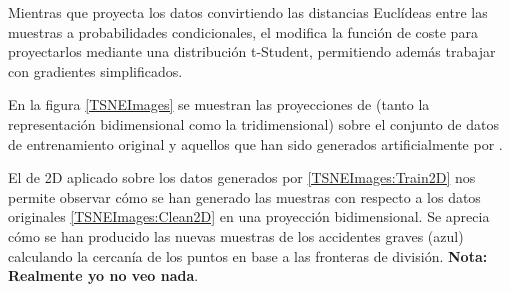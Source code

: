             Mientras que  proyecta los datos convirtiendo las distancias Euclídeas entre las muestras a probabilidades condicionales, el  modifica la función de coste para proyectarlos mediante una distribución t-Student, permitiendo además trabajar con gradientes simplificados.


            En la figura \ref{TSNEImages} se muestran las proyecciones de  (tanto la representación bidimensional como la tridimensional) sobre el conjunto de datos de entrenamiento original y aquellos que han sido generados artificialmente por .

            El  de 2D aplicado sobre los datos generados por  \ref{TSNEImages:Train2D} nos permite observar cómo se han generado las muestras con respecto a los datos originales \ref{TSNEImages:Clean2D} en una proyección bidimensional. Se aprecia cómo se han producido las nuevas muestras de los accidentes graves (azul) calculando la cercanía de los puntos en base a las fronteras de división. \textbf{Nota: Realmente yo no veo nada}.


